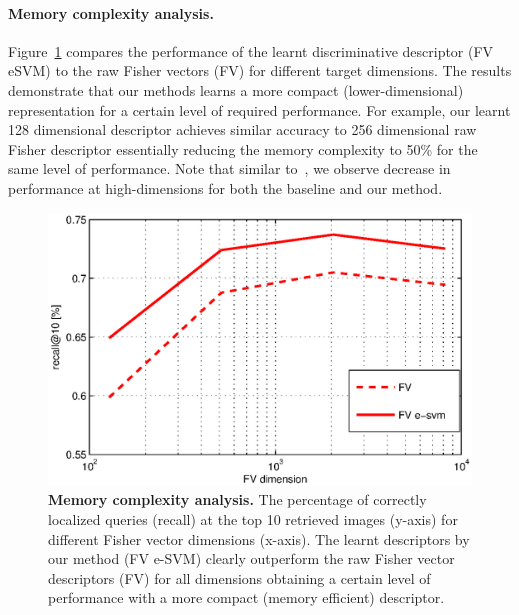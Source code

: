 \documentclass[table]{article} %
\begin{document}
		\paragraph{Memory complexity analysis.}
		Figure~\ref{fig:memory} compares the performance of the learnt discriminative descriptor (FV eSVM) to the raw Fisher vectors (FV) for different target dimensions. %
        The results demonstrate that our methods learns a more compact (lower-dimensional) representation for a certain level of required performance. For example, our learnt 128 dimensional descriptor achieves similar accuracy to 256 dimensional raw Fisher descriptor essentially reducing the memory complexity to 50\% for the same level of performance.  Note that 
        similar to~\cite{Jegou12}, we observe decrease in performance at high-dimensions for both the baseline and our method.    		
		
			\begin{figure}[t!]
    \centering
    \includegraphics[width=0.7\linewidth]{imgs/FVmemory}    
    \caption{
        \textbf{Memory complexity analysis.} The percentage of correctly localized queries (recall) at the top 10 retrieved images (y-axis) for different Fisher vector dimensions (x-axis). The learnt descriptors by our method (FV e-SVM) clearly outperform the raw Fisher vector descriptors (FV) for all dimensions obtaining a certain level of performance with a more compact (memory efficient) descriptor.
    }
    \label{fig:memory}
\end{figure}
\end{document}
